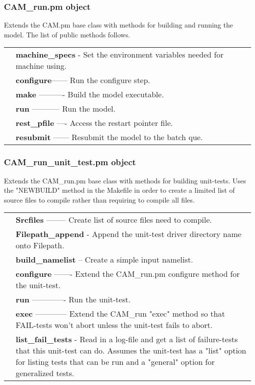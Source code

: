 \documentclass[]{article}
\begin{document}
\subsubsection{CAM\_run.pm object}
Extends the CAM.pm base class with methods for building and running the model. The
list of public methods follows.\\
\begin{tabular}{r p{3.7in}}
& {\bf machine\_specs} - Set the environment variables needed for machine using.\\
& {\bf configure}------ Run the configure step.\\
& {\bf make} ---------- Build the model executable.\\
& {\bf run} ----------- Run the model.\\
& {\bf rest\_pfile} ---- Access the restart pointer file.\\
& {\bf resubmit} ------ Resubmit the model to the batch que.\\
\end{tabular}
\subsubsection{CAM\_run\_unit\_test.pm object}
Extends the CAM\_run.pm base class with methods for building unit-tests. Uses the "NEWBUILD"
method in the Makefile in order to create a limited list of source files to compile rather
than requiring to compile all files.\\
\begin{tabular}{r p{3.7in}}
	& {\bf Srcfiles} -------- Create list of source files need to compile.\\
	& {\bf Filepath\_append} - Append the unit-test driver directory name onto Filepath.\\
	& {\bf build\_namelist} -- Create a simple input namelist.\\
	& {\bf configure} ------- Extend the CAM\_run.pm configure method for the unit-test.\\
	& {\bf run} ------------- Run the unit-test.\\
	& {\bf exec} ------------ Extend the CAM\_run "exec" method so that FAIL-tests won't
			abort unless the unit-test fails to abort.\\
	& {\bf list\_fail\_tests} - Read in a log-file and get a list of failure-tests that
			this unit-test can do. Assumes the unit-test has a "list" option for
			listing tests that can be run and a "general" option for generalized tests.
\end{tabular}
\end{document}
